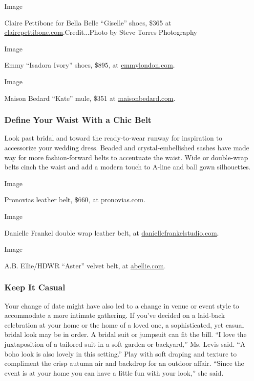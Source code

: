 Image

Claire Pettibone for Bella Belle ``Giselle'' shoes, \$365 at
\href{https://clairepettibone.com/collections/claire-pettibone-for-bella-belle/products/giselle-lace-wedding-shoes-claire-pettibone-for-bella-belle}{clairepettibone.com}.Credit...Photo
by Steve Torres Photography

Image

Emmy ``Isadora Ivory'' shoes, \$895, at
\href{https://www.emmylondon.com/products/isadora-ivory}{emmylondon.com}.

Image

Maison Bedard ``Kate'' mule, \$351 at
\href{https://maisonbedard.com/products/kate-mule-apple-blossom?_pos=2\&_sid=489d0a501\&_ss=r}{maisonbedard.com}.

\hypertarget{define-your-waist-with-a-chic-belt}{%
\subsubsection{\texorpdfstring{\textbf{Define Your Waist With a Chic
Belt}}{Define Your Waist With a Chic Belt}}\label{define-your-waist-with-a-chic-belt}}

Look past bridal and toward the ready-to-wear runway for inspiration to
accessorize your wedding dress. Beaded and crystal-embellished sashes
have made way for more fashion-forward belts to accentuate the waist.
Wide or double-wrap belts cinch the waist and add a modern touch to
A-line and ball gown silhouettes.

Image

Pronovias leather belt, \$660, at
\href{https://www.pronovias.com/lar21aa1}{pronovias.com}.

Image

Danielle Frankel double wrap leather belt, at
\href{https://www.daniellefrankelstudio.com/products/oblique-pearl-and-chain-belt}{daniellefrankelstudio.com}.

Image

A.B. Ellie/HDWR ``Aster'' velvet belt, at
\href{https://www.abellie.com/shop-hdwr/aster-belt}{abellie.com}.

\hypertarget{keep-it-casual}{%
\subsubsection{\texorpdfstring{\textbf{Keep It
Casual}}{Keep It Casual}}\label{keep-it-casual}}

Your change of date might have also led to a change in venue or event
style to accommodate a more intimate gathering. If you've decided on a
laid-back celebration at your home or the home of a loved one, a
sophisticated, yet casual bridal look may be in order. A bridal suit or
jumpsuit can fit the bill. ``I love the juxtaposition of a tailored suit
in a soft garden or backyard,'' Ms. Levis said. ``A boho look is also
lovely in this setting.'' Play with soft draping and texture to
compliment the crisp autumn air and backdrop for an outdoor affair.
``Since the event is at your home you can have a little fun with your
look,'' she said.

